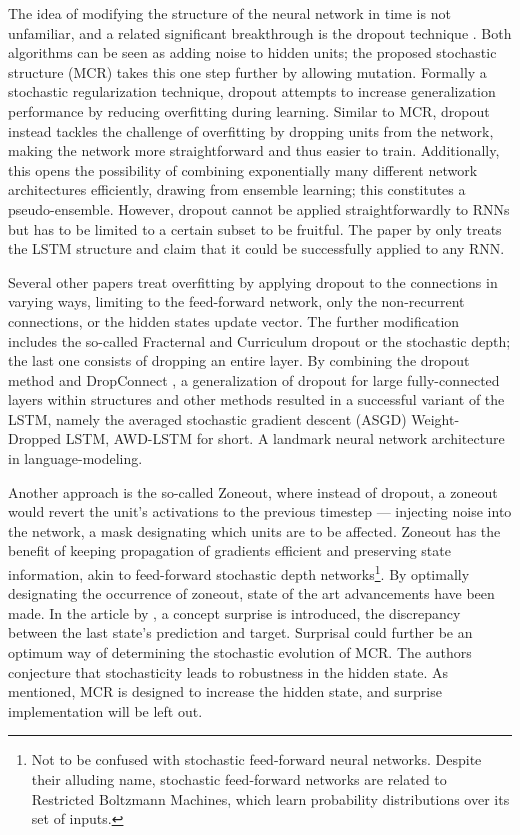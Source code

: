 The idea of modifying the structure of the neural network in time is not unfamiliar, and a related significant breakthrough is the dropout technique \cite{drop}. Both algorithms can be seen as adding noise to hidden units; the proposed stochastic structure (MCR) takes this one step further by allowing mutation. Formally a stochastic regularization technique, dropout attempts to increase generalization performance by reducing overfitting during learning. Similar to MCR, dropout instead tackles the challenge of overfitting by dropping units from the network, making the network more straightforward and thus easier to train. Additionally, this opens the possibility of combining exponentially many different network architectures efficiently, drawing from ensemble learning; this constitutes a pseudo-ensemble. However, dropout cannot be applied straightforwardly to RNNs \cite{dropno} but has to be limited to a certain subset\cite{droprnn} to be fruitful. The paper by \textcite{droprnn} only treats the LSTM structure and claim that it could be successfully applied to any RNN. 

Several other papers treat overfitting by applying dropout to the connections in varying ways, limiting to the feed-forward network, only the non-recurrent connections, or the hidden states update vector. The further modification includes the so-called Fracternal and Curriculum dropout or the stochastic depth; the last one consists of dropping an entire layer\cite{stochdep}. By combining the dropout method and DropConnect \cite{DropConnect}, a generalization of dropout for large fully-connected layers within structures and other methods resulted in a successful variant of the LSTM, namely the averaged stochastic gradient descent (ASGD) Weight-Dropped LSTM, AWD-LSTM for short. A landmark neural network architecture in language-modeling. 

Another approach is the so-called Zoneout\cite{zoneo}, where instead of dropout, a zoneout would revert the unit's activations to the previous timestep — injecting noise into the network, a mask designating which units are to be affected. Zoneout has the benefit of keeping propagation of gradients efficient and preserving state information, akin to feed-forward stochastic depth networks\footnote{Not to be confused with stochastic feed-forward neural networks. Despite their alluding name, stochastic feed-forward networks are related to Restricted Boltzmann Machines, which learn probability distributions over its set of inputs.}. By optimally designating the occurrence of zoneout, state of the art advancements have been made\cite{Zoneout}. In the article by \textcite{Zoneout}, a concept surprise is introduced, the discrepancy between the last state's prediction and target. Surprisal could further be an optimum way of determining the stochastic evolution of MCR. The authors \textcite{Zoneout} conjecture that stochasticity leads to robustness in the hidden state. As mentioned, MCR is designed to increase the hidden state, and surprise implementation will be left out.

